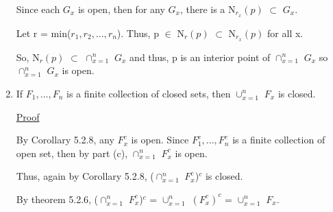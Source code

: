 \begin{enumerate}[label=(\alph*), leftmargin=2cm, itemsep=0.4em]
				Since each $G_x$ is open, then for any $G_x$, there is a
				N$_{r_x}(p)$ $\subset$ $G_x$.

				Let r = min($r_1, r_2 , ... , r_n$).
				Thus, p $\in$ N$_r(p)$ $\subset$ N$_{r_x}(p)$ for all x.

				So, N$_r(p)$ $\subset$ $\cap_{x=1}^n$ $G_x$ and thus,
				p is an interior point of $\cap_{x=1}^n$ $G_x$ so
			    $\cap_{x=1}^n$ $G_x$ is open.

		\item If $F_1, ... , F_n$ is a finite collection of closed sets,
		then $\cup_{x=1}^n$ $F_x$ is closed.

			{ \color{magenta} \underline{Proof} }

				By {\color{orange} Corollary 5.2.8}, any $F_x^c$ is open.
				Since $F_1^c, ... , F_n^c$ is a finite collection of
				open set, then by part (c), $\cap_{x=1}^n$ $F_x^c$ is open.

				Thus, again by {\color{orange} Corollary 5.2.8},
				($\cap_{x=1}^n$ $F_x^c$)$^c$ is closed.

				By {\color{red} theorem 5.2.6},
				($\cap_{x=1}^n$ $F_x^c$)$^c$ = $\cup_{x=1}^n$ $(F_x^c)^c$
				= $\cup_{x=1}^n$ $F_x$.
	\end{enumerate}



